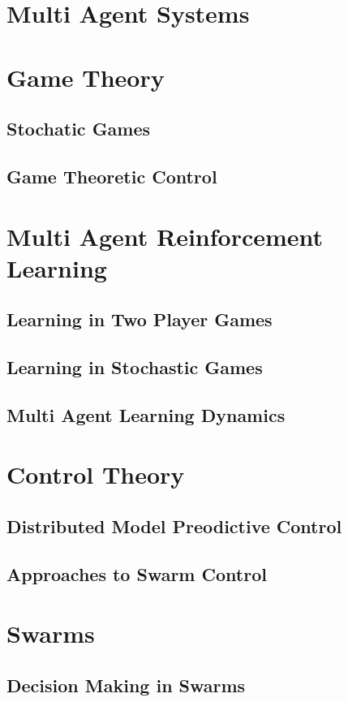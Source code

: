 \documentclass[.../main.tex]{subfiles}
\begin{document}
    
    \section{Multi Agent Systems} \label{sec::Multi_Agent_Systems}

    \section{Game Theory} \label{sec::Game_Theory}
    \subsection{Stochatic Games} \label{sec::Stochastic_Games}
    \subsection{Game Theoretic Control} \label{Game Theoretic Control}

    \section{Multi Agent Reinforcement Learning} \label{sec::MARL}
    \subsection{Learning in Two Player Games} \label{sec::Two_Player_Games}
    \subsection{Learning in Stochastic Games} \label{sec::Learning_Stochastic_Games}
    \subsection{Multi Agent Learning Dynamics} \label{sec::MARL_Dynamics}

    \section{Control Theory} \label{sec::Control_Theory}
    \subsection{Distributed Model Preodictive Control} \label{sec::Distributed_MPC}
    \subsection{Approaches to Swarm Control} \label{sec::Swarm Control}

    \section{Swarms} \label{sec::Swarms}
    \subsection{Decision Making in Swarms} \label{sec::Decisions_in_Swarms}
\end{document}
